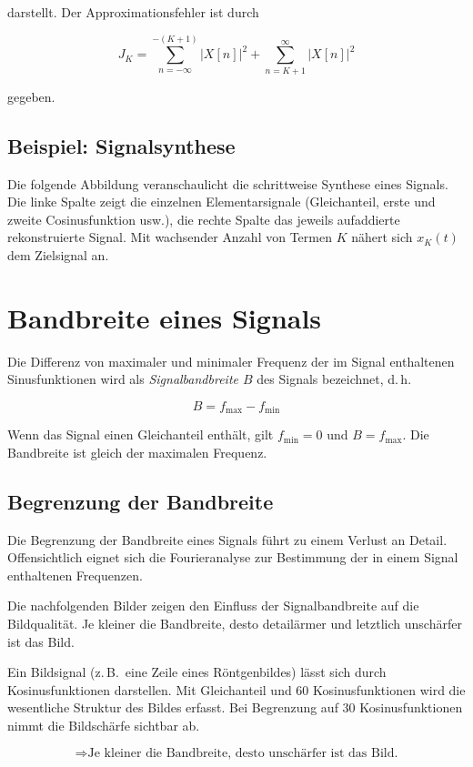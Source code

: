 darstellt. Der Approximationsfehler ist durch

$$
J_K = \sum_{n=-\infty}^{-(K+1)} |X[n]|^2 + \sum_{n=K+1}^{\infty} |X[n]|^2
$$

gegeben.

\subsection*{Beispiel: Signalsynthese}

Die folgende Abbildung veranschaulicht die schrittweise Synthese eines Signals. Die linke Spalte zeigt die einzelnen Elementarsignale (Gleichanteil, erste und zweite Cosinusfunktion usw.), die rechte Spalte das jeweils aufaddierte rekonstruierte Signal. Mit wachsender Anzahl von Termen $K$ nähert sich $x_K(t)$ dem Zielsignal an.

\section{Bandbreite eines Signals}
\label{sec:bandbreite}

\begin{definition}[Signalbandbreite]
Die Differenz von maximaler und minimaler Frequenz der im Signal enthaltenen Sinusfunktionen wird als \textit{Signalbandbreite $B$} des Signals bezeichnet, d.\,h.

$$
B = f_{\max} - f_{\min}
$$

Wenn das Signal einen Gleichanteil enthält, gilt $f_{\min} = 0$ und $B = f_{\max}$. Die Bandbreite ist gleich der maximalen Frequenz.
\end{definition}

\subsection*{Begrenzung der Bandbreite}

Die Begrenzung der Bandbreite eines Signals führt zu einem Verlust an Detail. Offensichtlich eignet sich die Fourieranalyse zur Bestimmung der in einem Signal enthaltenen Frequenzen.

\begin{beispiel}
Die nachfolgenden Bilder zeigen den Einfluss der Signalbandbreite auf die Bildqualität. Je kleiner die Bandbreite, desto detailärmer und letztlich unschärfer ist das Bild.

Ein Bildsignal (z.\,B.\ eine Zeile eines Röntgenbildes) lässt sich durch Kosinusfunktionen darstellen. Mit Gleichanteil und 60 Kosinusfunktionen wird die wesentliche Struktur des Bildes erfasst. Bei Begrenzung auf 30 Kosinusfunktionen nimmt die Bildschärfe sichtbar ab.

$$
\Rightarrow \text{Je kleiner die Bandbreite, desto unschärfer ist das Bild.}
$$

\end{beispiel}

